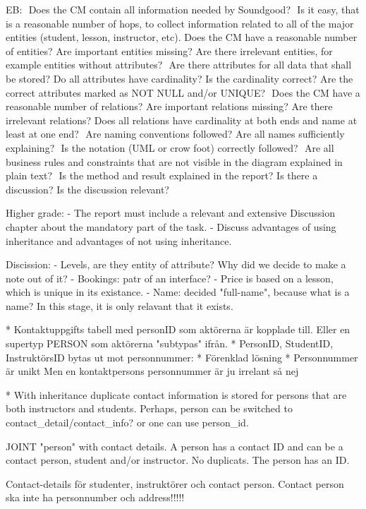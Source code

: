 \documentclass[a4paper]{scrartcl}
\begin{document}
EB:
 Does the CM contain all information needed by Soundgood?
 Is it easy, that is a reasonable number of hops, to collect information related to all of the major entities (student, lesson, instructor, etc).
 Does the CM have a reasonable number of entities? Are important entities missing? Are there irrelevant entities, for example entities without attributes?
 Are there attributes for all data that shall be stored? Do all attributes have cardinality? Is the cardinality correct? Are the correct attributes marked as NOT NULL and/or UNIQUE?
 Does the CM have a reasonable number of relations? Are important relations missing? Are there irrelevant relations? Does all relations have cardinality at both ends and name at least at one end?
 Are naming conventions followed? Are all names sufficiently explaining?
 Is the notation (UML or crow foot) correctly followed?
 Are all business rules and constraints that are not visible in the diagram explained in plain text?
 Is the method and result explained in the report? Is there a discussion? Is the discussion relevant?

Higher grade:
- The report must include a relevant and extensive Discussion chapter about the mandatory part of the task.
- Discuss advantages of using inheritance and advantages of not using inheritance. 


Discission: 
- Levels, are they entity of attribute? Why did we decide to make a note out of it? 
- Bookings: patr of an interface? 
- Price is based on a lesson, which is unique in its existance.
- Name: decided "full-name", because what is a name? In this stage, it is only relavant that it exists. 

* Kontaktuppgifts tabell med personID som aktörerna är kopplade till. Eller en
  supertyp PERSON som aktörerna "subtypas" ifrån. 
* PersonID, StudentID, InstruktörsID bytas ut mot personnummer:
    * Förenklad lösning
    * Personnummer är unikt
  Men en kontaktpersons personnummer är ju irrelant så nej

* With inheritance duplicate contact information is stored for persons that are both instructors and students. Perhaps, person can be switched to contact_detail/contact_info?
or one can use person_id. 

JOINT "person" with contact details. A person has a contact ID and can be a contact person, student and/or instructor. No duplicats. The person has an ID.

Contact-details för studenter, instruktörer och contact person. Contact person ska inte ha personnumber och address!!!!!
\end{document}
